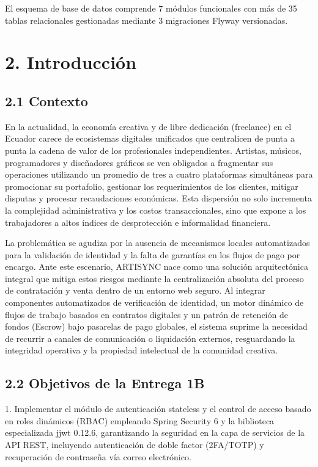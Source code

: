 \documentclass[
]{article}
\begin{document}
El esquema de base de datos comprende 7 módulos funcionales con más de
35 tablas relacionales gestionadas mediante 3 migraciones Flyway
versionadas.

\section{2. Introducción}

\subsection{2.1 Contexto}

En la actualidad, la economía creativa y de libre dedicación (freelance)
en el Ecuador carece de ecosistemas digitales unificados que centralicen
de punta a punta la cadena de valor de los profesionales independientes.
Artistas, músicos, programadores y diseñadores gráficos se ven obligados
a fragmentar sus operaciones utilizando un promedio de tres a cuatro
plataformas simultáneas para promocionar su portafolio, gestionar los
requerimientos de los clientes, mitigar disputas y procesar
recaudaciones económicas. Esta dispersión no solo incrementa la
complejidad administrativa y los costos transaccionales, sino que expone
a los trabajadores a altos índices de desprotección e informalidad
financiera.

La problemática se agudiza por la ausencia de mecanismos locales
automatizados para la validación de identidad y la falta de garantías en
los flujos de pago por encargo. Ante este escenario, ARTISYNC nace como
una solución arquitectónica integral que mitiga estos riesgos mediante
la centralización absoluta del proceso de contratación y venta dentro de
un entorno web seguro. Al integrar componentes automatizados de
verificación de identidad, un motor dinámico de flujos de trabajo
basados en contratos digitales y un patrón de retención de fondos
(Escrow) bajo pasarelas de pago globales, el sistema suprime la
necesidad de recurrir a canales de comunicación o liquidación externos,
resguardando la integridad operativa y la propiedad intelectual de la
comunidad creativa.

\subsection{2.2 Objetivos de la Entrega
1B}

1. Implementar el módulo de autenticación stateless y el control de
acceso basado en roles dinámicos (RBAC) empleando Spring Security 6 y la
biblioteca especializada jjwt 0.12.6, garantizando la seguridad en la
capa de servicios de la API REST, incluyendo autenticación de doble
factor (2FA/TOTP) y recuperación de contraseña vía correo electrónico.
\end{document}
